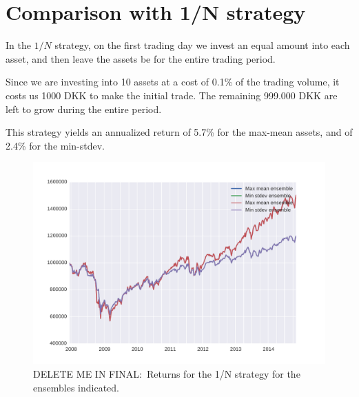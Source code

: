 \section{Comparison with 1/N strategy}

In the $1/N$ strategy, on the first trading day we invest  an equal amount into each asset, and then leave the assets be for the entire trading period.

Since we are investing into 10 assets at a cost of 0.1\% of the trading volume, it costs us 1000 DKK to make the initial trade.
The remaining 999.000 DKK are left to grow during the entire period.

This strategy yields an annualized return of 5.7\% for the max-mean assets, and of 2.4\% for the min-stdev.


\begin{figure}[tp]
\centering
\includegraphics{../pic/returns_1overN_only.pdf}
\caption{DELETE ME IN FINAL:\ Returns for the 1/N strategy for the ensembles indicated.}
\label{fig:bondsyield}
\end{figure}
